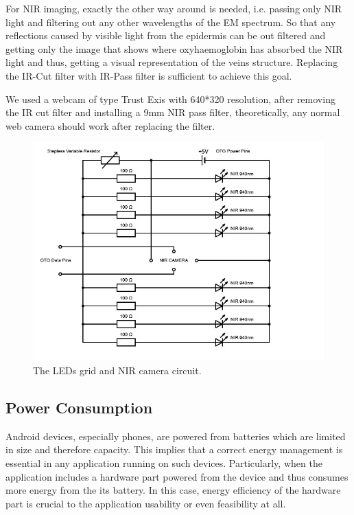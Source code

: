 For NIR imaging, exactly the other way around is needed, i.e. passing only NIR light and filtering out any other wavelengths of the EM spectrum. So that any reflections caused by visible light from the epidermis can be out filtered and getting only the image that shows where oxyhaemoglobin has absorbed the NIR light and thus, getting a visual representation of the veins structure. Replacing the IR-Cut filter with IR-Pass filter is sufficient to achieve this goal.

We used a  webcam of type Trust Exis with 640*320 resolution, after removing the IR cut filter and installing a 9mm NIR pass filter, theoretically, any normal web camera should work after replacing the filter.

\begin{figure}[H]
\centering
\includegraphics{figures/circuit.jpg}
\caption{The LEDs grid and NIR camera circuit.}\label{fig:circuit}
\end{figure}


\subsection{Power Consumption}
Android devices, especially phones, are powered from batteries which are limited in size and therefore capacity. This implies that a correct energy management is essential in any application running on such devices. Particularly, when the application includes a hardware part powered from the device and thus consumes more energy from the its battery. In this case, energy efficiency of the hardware part is crucial to the application usability or even feasibility at all.

